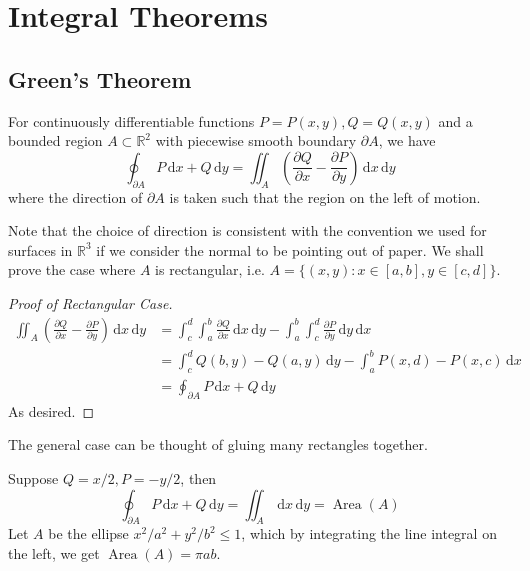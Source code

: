 \section{Integral Theorems}
\subsection{Green's Theorem}
\begin{proposition}
    For continuously differentiable functions $P=P(x,y),Q=Q(x,y)$ and a bounded region $A\subset\mathbb R^2$ with piecewise smooth boundary $\partial A$, we have
    $$\oint_{\partial A}P\,\mathrm dx+Q\,\mathrm dy=\iint_A\left( \frac{\partial Q}{\partial x}-\frac{\partial P}{\partial y} \right)\,\mathrm dx\,\mathrm dy$$
    where the direction of $\partial A$ is taken such that the region on the left of motion.
\end{proposition}
Note that the choice of direction is consistent with the convention we used for surfaces in $\mathbb R^3$ if we consider the normal to be pointing out of paper.
We shall prove the case where $A$ is rectangular, i.e. $A=\{(x,y):x\in [a,b],y\in[c,d]\}$.
\begin{proof}[Proof of Rectangular Case]
    \begin{align*}
        \iint_A\left( \frac{\partial Q}{\partial x}-\frac{\partial P}{\partial y} \right)\,\mathrm dx\,\mathrm dy
        &=\int_c^d\int_a^b\frac{\partial Q}{\partial x}\,\mathrm dx\,\mathrm dy-\int_a^b\int_c^d\frac{\partial P}{\partial y}\,\mathrm dy\,\mathrm dx\\
        &=\int_c^dQ(b,y)-Q(a,y)\,\mathrm dy-\int_a^bP(x,d)-P(x,c)\,\mathrm dx\\
        &=\oint_{\partial A}P\,\mathrm dx+Q\,\mathrm dy
    \end{align*}
    As desired.
\end{proof}
The general case can be thought of gluing many rectangles together.
\begin{example}
    Suppose $Q=x/2,P=-y/2$, then
    $$\oint_{\partial A}P\,\mathrm dx+Q\,\mathrm dy=\iint_A\,\mathrm dx\,\mathrm dy=\operatorname{Area}(A)$$
    Let $A$ be the ellipse $x^2/a^2+y^2/b^2\le1$, which by integrating the line integral on the left, we get $\operatorname{Area}(A)=\pi ab$.
\end{example}
